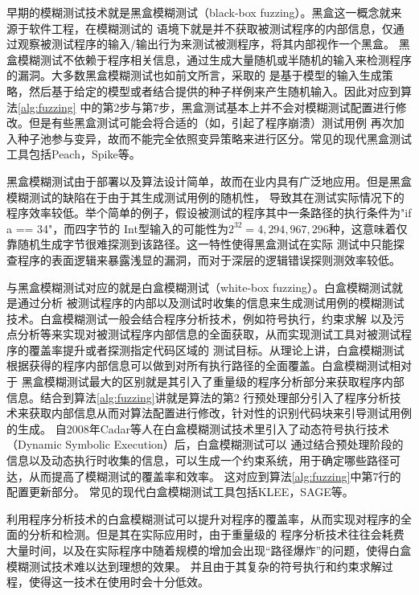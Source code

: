 \documentclass[bachelor]{njupthesis}
\begin{document}
早期的模糊测试技术就是黑盒模糊测试\cite{beizer1995black}（black-box fuzzing）。黑盒这一概念就来源于软件工程，在模糊测试的
语境下就是并不获取被测试程序的内部信息，仅通过观察被测试程序的输入/输出行为来测试被测程序，将其内部视作一个黑盒。
黑盒模糊测试不依赖于程序相关信息，通过生成大量随机或半随机的输入来检测程序的漏洞。大多数黑盒模糊测试也如前文所言，采取的
是基于模型的输入生成策略，然后基于给定的模型或者结合提供的种子样例来产生随机输入。因此对应到算法\ref{alg:fuzzing}
中的第2步与第7步，黑盒测试基本上并不会对模糊测试配置进行修改。但是有些黑盒测试可能会将合适的（如，引起了程序崩溃）测试用例
再次加入种子池参与变异，故而不能完全依照变异策略来进行区分。常见的现代黑盒测试工具包括Peach\cite{Peach}，Spike\cite{Spike}等。

黑盒模糊测试由于部署以及算法设计简单，故而在业内具有广泛地应用。但是黑盒模糊测试的缺陷在于由于其生成测试用例的随机性，
导致其在测试实际情况下的程序效率较低。举个简单的例子，假设被测试的程序其中一条路径的执行条件为"if a == 34"，而四字节的
Int型输入的可能性为$2^{32}=4,294,967,296$种，这意味着仅靠随机生成字节很难探测到该路径。这一特性使得黑盒测试在实际
测试中只能探查程序的表面逻辑来暴露浅显的漏洞，而对于深层的逻辑错误探则测效率较低。

与黑盒模糊测试对应的就是白盒模糊测试\cite{godefroid2008automated}（white-box fuzzing）。白盒模糊测试就是通过分析
被测试程序的内部以及测试时收集的信息来生成测试用例的模糊测试技术。白盒模糊测试一般会结合程序分析技术，例如符号执行，约束求解
以及污点分析等来实现对被测试程序内部信息的全面获取，从而实现测试工具对被测试程序的覆盖率提升或者探测指定代码区域的
测试目标。从理论上讲，白盒模糊测试根据获得的程序内部信息可以做到对所有执行路径的全面覆盖。白盒模糊测试相对于
黑盒模糊测试最大的区别就是其引入了重量级的程序分析部分来获取程序内部信息。结合到算法\ref{alg:fuzzing}讲就是算法的第2
行预处理部分引入了程序分析技术来获取内部信息从而对算法配置进行修改，针对性的识别代码块来引导测试用例的生成\cite{godefroid2008automated}。
自2008年Cadar等人在白盒模糊测试技术里引入了动态符号执行技术（Dynamic Symbolic Execution）\cite{cadar2008klee}后，白盒模糊测试可以
通过结合预处理阶段的信息以及动态执行时收集的信息，可以生成一个约束系统，用于确定哪些路径可达，从而提高了模糊测试的覆盖率和效率。
这对应到算法\ref{alg:fuzzing}中第7行的配置更新部分。
常见的现代白盒模糊测试工具包括KLEE\cite{cadar2008klee}，SAGE\cite{sage}等。

利用程序分析技术的白盒模糊测试可以提升对程序的覆盖率，从而实现对程序的全面的分析和检测。但是其在实际应用时，由于重量级的
程序分析技术往往会耗费大量时间，以及在实际程序中随着规模的增加会出现“路径爆炸”的问题，使得白盒模糊测试技术难以达到理想的效果。
并且由于其复杂的符号执行和约束求解过程，使得这一技术在使用时会十分低效。
\end{document}
